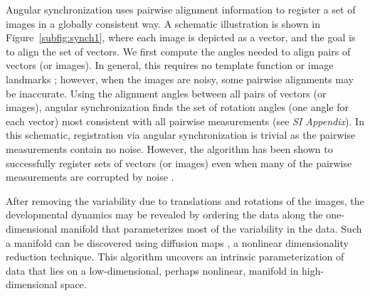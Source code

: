 \documentclass{pnastwo}
\begin{document}
\begin{article}
Angular synchronization uses pairwise alignment information to register a set of images in a globally consistent way.
%
A schematic illustration is shown in Figure~\ref{subfig:synch1}, where each image is depicted as a vector, and the goal is to align the set of vectors.
%
We first compute the angles needed to align pairs of vectors (or images).
%
In general, this requires no template function \cite{ahuja2007template} or image landmarks \cite{ian1998statistical}; 
however, when the images are noisy, some pairwise alignments may be inaccurate.
%
Using the alignment angles between all pairs of vectors (or images), angular synchronization finds the set of rotation angles (one angle for each vector) most consistent with all pairwise measurements (see {\it SI Appendix}).
%
In this schematic, registration via angular synchronization is trivial as the pairwise measurements contain no noise.
%
However, the algorithm has been shown to successfully register sets of vectors (or images) even when many of the pairwise measurements are corrupted by noise \cite{singer2011angular}.
%

%
After removing the variability due to translations and rotations of the images, the developmental dynamics may be revealed by ordering the data along the one-dimensional manifold that parameterizes most of the variability in the data.
%
Such a manifold can be discovered using diffusion maps \cite{coifman2005geometric}, a nonlinear dimensionality reduction technique.
%
This algorithm uncovers an intrinsic parameterization of data that lies on a low-dimensional, perhaps nonlinear, manifold in high-dimensional space.
%


\end{article}
\end{document}
